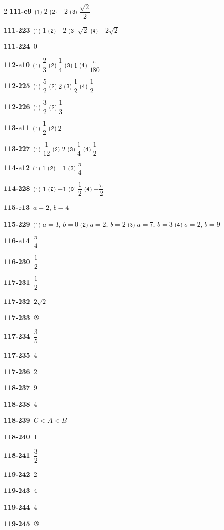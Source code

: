 \documentclass[10pt,a4paper]{article}
\begin{document}
\begin{multicols}{2}
\noindent\textbf{111-e9}\ ⑴ $2$ ⑵ $-2$ ⑶ $\dfrac{\sqrt{2}}{2}$\par
\noindent\textbf{111-223}\ ⑴ $1$ ⑵ $-2$ ⑶ $\sqrt{2}$ ⑷ $-2\sqrt{2}$\par
\noindent\textbf{111-224}\ $0$\par
\noindent\textbf{112-e10}\ ⑴ $\dfrac{2}{3}$ ⑵ $\dfrac{1}{4}$ ⑶ $1$ ⑷ $\dfrac{\pi}{180}$\par
\noindent\textbf{112-225}\ ⑴ $\dfrac{5}{2}$ ⑵ $2$ ⑶ $\dfrac{1}{2}$ ⑷ $\dfrac{1}{2}$\par
\noindent\textbf{112-226}\ ⑴ $\dfrac{3}{2}$ ⑵ $\dfrac{1}{3}$\par
\noindent\textbf{113-e11}\ ⑴ $\dfrac{1}{2}$ ⑵ $2$\par
\noindent\textbf{113-227}\ ⑴ $\dfrac{1}{12}$ ⑵ $2$ ⑶ $\dfrac{1}{4}$ ⑷ $\dfrac{1}{2}$\par
\noindent\textbf{114-e12}\ ⑴ $1$ ⑵ $-1$ ⑶ $\dfrac{\pi}{4}$\par
\noindent\textbf{114-228}\ ⑴ $1$ ⑵ $-1$ ⑶ $\dfrac{1}{2}$ ⑷ $-\dfrac{\pi}{2}$\par
\noindent\textbf{115-e13}\ $a=2$, $b=4$\par
\noindent\textbf{115-229}\ ⑴ $a=3$, $b=0$ ⑵ $a=2$, $b=2$ ⑶ $a=7$, $b=3$ ⑷ $a=2$, $b=9$\par
\noindent\textbf{116-e14}\ $\dfrac{\pi}{4}$\par
\noindent\textbf{116-230}\ $\dfrac{1}{2}$\par
\noindent\textbf{117-231}\ $\dfrac{1}{2}$\par
\noindent\textbf{117-232}\ $2\sqrt{2}$\par
\noindent\textbf{117-233}\ ⑤\par
\noindent\textbf{117-234}\ $\dfrac{3}{5}$\par
\noindent\textbf{117-235}\ $4$\par
\noindent\textbf{117-236}\ $2$\par
\noindent\textbf{118-237}\ $9$\par
\noindent\textbf{118-238}\ $4$\par
\noindent\textbf{118-239}\ $C<A<B$\par
\noindent\textbf{118-240}\ $1$\par
\noindent\textbf{118-241}\ $\dfrac{3}{2}$\par
\noindent\textbf{119-242}\ $2$\par
\noindent\textbf{119-243}\ $4$\par
\noindent\textbf{119-244}\ $4$\par
\noindent\textbf{119-245}\ ③\par

\end{multicols}
\end{document}
